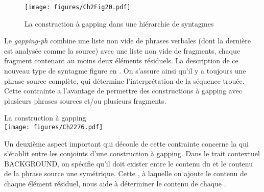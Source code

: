 \begin{figure}
\texttt{[image: figures/Ch2Fig20.pdf]}%
\caption{La construction à gapping dans une hiérarchie de syntagmes}
\label{ch2:fig20}
\end{figure}


Le \textit{gapping-ph} combine une liste non vide de phrases verbales (dont la dernière est analysée comme la source) avec une liste non vide de fragments, chaque fragment contenant au moins deux éléments résiduels. La description de ce nouveau type de syntagme figure en . On s’assure ainsi qu’il y a toujours une phrase source complète, qui détermine l’interprétation de la séquence trouée. Cette contrainte a l’avantage de permettre des constructions à gapping avec plusieurs phrases sources et/ou plusieurs fragments. 

\newpage  
\ea \label{ch2:ex276}
La construction à gapping\\
\texttt{[image: figures/Ch2276.pdf]}



\z

Un deuxième aspect important qui découle de cette contrainte concerne la  qui s’établit entre les conjoints d’une construction à gapping. Dans le trait contextuel BACKGROUND, on spécifie qu’il doit exister entre le contenu du  et le contenu de la phrase source une  symétrique. Cette , à laquelle on ajoute le contenu de chaque élément résiduel, nous aide à déterminer le contenu de chaque . 

